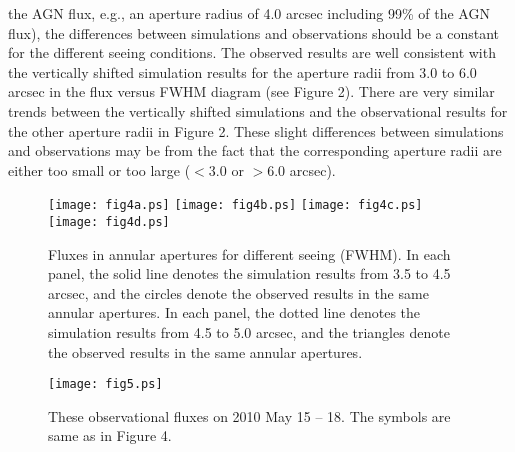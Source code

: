 \documentclass[structabstract]{raa}
\begin{document}
   the AGN flux, e.g., an aperture radius of 4.0 arcsec including 99\% of the AGN flux), the differences between simulations and
   observations should be a constant for the different seeing conditions. The observed results are well consistent with the vertically
   shifted simulation results for the aperture radii from 3.0 to 6.0 arcsec in the flux versus FWHM diagram (see Figure 2). There are
   very similar trends between the vertically shifted simulations and the observational results for the other aperture radii in Figure 2.
   These slight differences between simulations and observations may be from the fact that the corresponding aperture radii are
   either too small or too large ($<$3.0 or $>$6.0 arcsec).
  \begin{figure}
 \begin{center}
  \texttt{[image: fig4a.ps]}
  \texttt{[image: fig4b.ps]}
  \texttt{[image: fig4c.ps]}
  \texttt{[image: fig4d.ps]}
 \end{center}
 \caption{Fluxes in annular apertures for different seeing (FWHM). In each panel, the solid line denotes the simulation results from
    3.5 to 4.5 arcsec, and the circles denote the observed results in the same annular apertures. In each panel, the dotted line denotes
    the simulation results  from 4.5 to 5.0 arcsec, and the triangles denote the observed results in the same annular apertures.}
  \label{fig4}
\end{figure}
   \begin{figure}
   \begin{center}
        \texttt{[image: fig5.ps]}
     \end{center}
     \caption{These observational fluxes on 2010 May 15 -- 18. The symbols are same as in Figure 4.}
  \label{fig5}
\end{figure}
\end{document}
